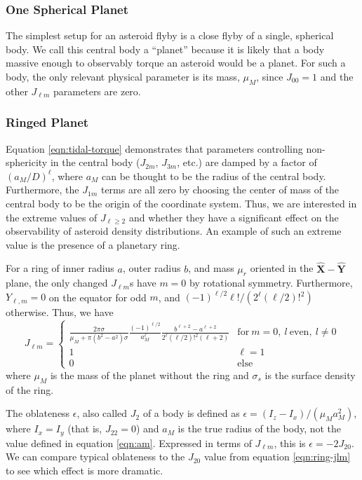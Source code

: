 \documentclass{aastex631}
\newcommand{\unit}[1]{\hat{\mathbf{#1}}}
\begin{document}
\subsubsection{One Spherical Planet}
The simplest setup for an asteroid flyby is a close flyby of a single, spherical body. We call this central body a ``planet'' because it is likely that a body massive enough to observably torque an asteroid would be a planet. For such a body, the only relevant physical parameter is its mass, $\mu_M$, since $J_{00} = 1$ and the other $J_{\ell m}$ parameters are zero.

\subsubsection{Ringed Planet}
Equation \ref{eqn:tidal-torque} demonstrates that parameters controlling non-sphericity in the central body ($J_{2m}$, $J_{3m}$, etc.) are damped by a factor of $(a_M/D)^\ell$, where $a_M$ can be thought to be the radius of the central body. Furthermore, the $J_{1m}$ terms are all zero by choosing the center of mass of the central body to be the origin of the coordinate system. Thus, we are interested in the extreme values of $J_{\ell \geq 2}$ and whether they have a significant effect on the observability of asteroid density distributions. An example of such an extreme value is the presence of a planetary ring.

For a ring of inner radius $a$, outer radius $b$, and mass $\mu_r$ oriented in the $\unit X-\unit Y$ plane, the only changed $J_{\ell m}$s have $m = 0$ by rotational symmetry. Furthermore, $Y_{\ell, m} = 0$ on the equator for odd $m$, and $(-1)^{\ell/2} \ell! / (2^\ell (\ell/2)!^2)$ otherwise. Thus, we have
\begin{equation}
J_{\ell m} = \left\{\begin{array}{cc}
\frac{2 \pi \sigma}{\mu_M + \pi(b^2-a^2)\sigma}\frac{(-1)^{\ell/2}}{a_M^\ell}\frac{b^{\ell+2} - a^{\ell+2}}{2^\ell (\ell/2)!^2 (\ell + 2)}
 & \text{for}\ m = 0,\ l\ \text{even},\ l \neq 0\\
1 & \ell = 1\\
0 & \text{else}
\end{array}\right.
\label{eqn:ring-jlm}
\end{equation}
where $\mu_M$ is the mass of the planet without the ring and $\sigma_s$ is the surface density of the ring.


The oblateness $\epsilon$, also called $J_2$ of a body is defined as $\epsilon = (I_z - I_x)/(\mu_M a_M^2)$, where $I_x = I_y$ (that is, $J_{22} = 0$) and $a_M$ is the true radius of the body, not the value defined in equation \ref{eqn:am}. Expressed in terms of $J_{\ell m}$, this is $\epsilon = -2J_{20}$. We can compare typical oblateness to the $J_{20}$ value from equation \ref{eqn:ring-jlm} to see which effect is more dramatic.
\end{document}
